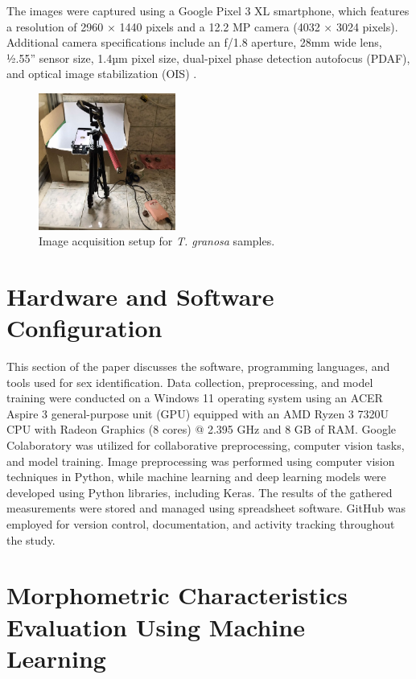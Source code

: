 The images were captured using a Google Pixel 3 XL smartphone, which features a resolution of 2960 × 1440 pixels and a 12.2 MP camera (4032 × 3024 pixels). Additional camera specifications include an f/1.8 aperture, 28mm wide lens, ½.55” sensor size, 1.4µm pixel size, dual-pixel phase detection autofocus (PDAF), and optical image stabilization (OIS) \cite{concepcion2023}.

\begin{figure}[!htbp]
	\centering
	\includegraphics[width=0.4\textwidth]{figures/setup.jpg}
	\caption{Image acquisition setup for \textit{T. granosa} samples.}
	\label{fig:setup}
\end{figure}

\newpage
\section{Hardware and Software Configuration}

This section of the paper discusses the software, programming languages, and tools used for sex identification. Data collection, preprocessing, and model training were conducted on a Windows 11 operating system using an ACER Aspire 3 general-purpose unit (GPU) equipped with an AMD Ryzen 3 7320U CPU with Radeon Graphics (8 cores) @ 2.395 GHz and 8 GB of RAM. Google Colaboratory was utilized for collaborative preprocessing, computer vision tasks, and model training. Image preprocessing was performed using computer vision techniques in Python, while machine learning and deep learning models were developed using Python libraries, including Keras. The results of the gathered measurements were stored and managed using spreadsheet software. GitHub was employed for version control, documentation, and activity tracking throughout the study.

\section{Morphometric Characteristics Evaluation Using Machine Learning }
\label{sec:ml models}


